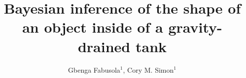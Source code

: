 \documentclass[openacc]{rsproca_new}%
\begin{document}
\title{Bayesian inference of the shape of an object inside of a gravity-drained tank}

\author{%
Gbenga Fabusola$^{1}$, 
Cory M. Simon$^{1}$
}

\address{$^{1}$School of Chemical, Biological, and Environmental Engineering. Oregon State University. Corvallis, OR, USA.
}

\subject{applied mathematics, chemical engineering}


\end{document}
